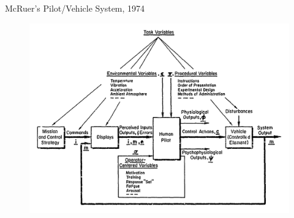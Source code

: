 \documentclass[10pt]{beamer}
\begin{document}
\begin{frame}[fragile]{McRuer's Pilot/Vehicle System, 1974~\cite{McRuer1974}}
  \begin{figure}[h!]
    \begin{center}
      \includegraphics[width=\linewidth]{../img/Screen_Shot_2018-07-25_at_10.37.08_AM.png}
    \end{center}
  \end{figure}
\end{frame}
\end{document}

